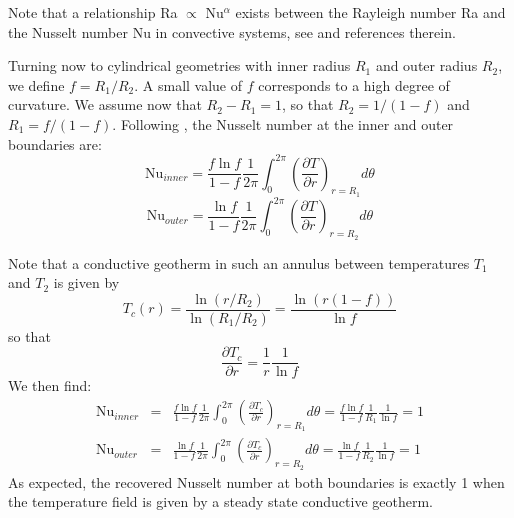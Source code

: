 \begin{itemize}
Note that a relationship Ra $\propto$ Nu$^\alpha $ exists between the Rayleigh number Ra and the Nusselt number Nu in convective systems, see \cite{wodd09} and references therein. 

Turning now to cylindrical geometries with inner radius $R_1$ and outer radius $R_2$, we define $f=R_1/R_2$. A small value of $f$ corresponds to a high
degree of curvature. We assume now that $R_2-R_1=1$, so that $R_2=1/(1-f)$ and $R_1=f/(1-f)$. 
Following \cite{jarv93}, the Nusselt number at the inner and outer boundaries are:
\begin{equation}
\boxed{
\text{Nu}_{inner} = \frac{f \ln f}{1-f} \frac{1}{2\pi} \int_0^{2\pi} \left( \frac{\partial T}{\partial r} \right)_{r=R_1} d\theta
}
\label{eqNuAnnIn}
\end{equation}
\begin{equation}
\boxed{
\text{Nu}_{outer} = \frac{\ln f}{1-f} \frac{1}{2\pi} \int_0^{2\pi} \left( \frac{\partial T}{\partial r} \right)_{r=R_2} d\theta
}
\label{eqNuAnnOut}
\end{equation}

Note that a conductive geotherm in such an annulus between temperatures $T_1$ and $T_2$ is given by 
\[
T_c(r)=\frac{\ln (r/R_2)}{\ln(R_1/R_2)} = \frac{\ln(r(1-f))}{\ln f}
\]
so that 
\[
\frac{\partial T_c}{\partial r} = \frac{1}{r}\frac{1}{\ln f} 
\]
We then find:
\begin{eqnarray}
\text{Nu}_{inner} 
&=& \frac{f \ln f}{1-f} \frac{1}{2\pi} \int_0^{2\pi} \left( \frac{\partial T_c}{\partial r} \right)_{r=R_1} d\theta
= \frac{f \ln f}{1-f} \frac{1}{R_1}\frac{1}{\ln f} 
= 1 \\
\text{Nu}_{outer} 
&=& \frac{\ln f}{1-f} \frac{1}{2\pi} \int_0^{2\pi} \left( \frac{\partial T_c}{\partial r} \right)_{r=R_2} d\theta 
= \frac{\ln f}{1-f} \frac{1}{R_2}\frac{1}{\ln f} = 1 
\end{eqnarray}
As expected, the recovered Nusselt number at both boundaries is exactly 1 when the temperature field is
given by a steady state conductive geotherm.



\end{itemize}
